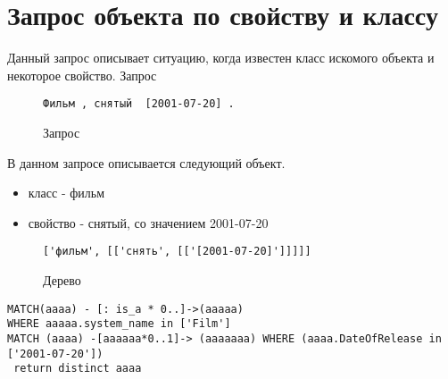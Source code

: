 \section{Запрос объекта по свойству и классу}
Данный запрос описывает ситуацию, когда известен класс искомого объекта и некоторое свойство.
Запрос
\begin{figure}[!h]
\begin{tcolorbox}[colback=white, sharpish corners]
\begin{verbatim}
Фильм , снятый  [2001-07-20] .
\end{verbatim}
\end{tcolorbox}
\caption{Запрос}
\end{figure}
В данном запросе описывается следующий объект.
\begin{itemize}
\item класс - фильм
\item свойство - снятый, со значением 2001-07-20
\end{itemize}
\begin{figure}[!h]
\begin{tcolorbox}[colback=white, sharpish corners]
\begin{verbatim}
['фильм', [['снять', [['[2001-07-20]']]]]]
\end{verbatim}
\end{tcolorbox}
\caption{Дерево}
\end{figure}
\begin{lstlisting}[caption={Результат}]
MATCH(aaaa) - [: is_a * 0..]->(aaaaa)
WHERE aaaaa.system_name in ['Film']
MATCH (aaaa) -[aaaaaa*0..1]-> (aaaaaaa) WHERE (aaaa.DateOfRelease in ['2001-07-20'])
 return distinct aaaa
\end{lstlisting}

